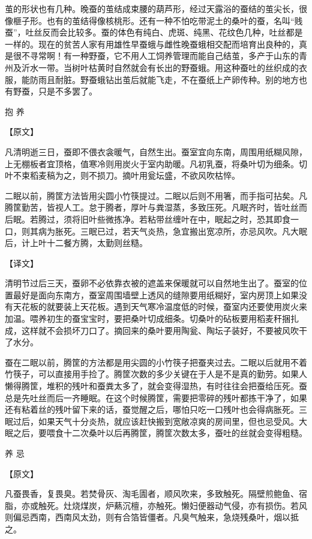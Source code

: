 \documentclass[12pt,UTF8]{ctexbook}
\begin{document}
茧的形状也有几种。晚蚕的茧结成束腰的葫芦形，经过天露浴的蚕结的茧尖长，很像榧子形。也有的茧结得像核桃形。还有一种不怕吃带泥土的桑叶的蚕，名叫“贱蚕”，吐丝反而会比较多。蚕的体色有纯白、虎斑、纯黑、花纹色几种，吐丝都是一样的。现在的贫苦人家有用雄性早蚕蛾与雌性晚蚕蛾相交配而培育出良种的，真是很不寻常啊！有一种野蚕，它不用人工饲养管理而能自己结茧，多产于山东的青州及沂水一带。当树叶枯黄时自然就会有长出的野蚕蛾。用这种蚕吐的丝织成的衣服，能防雨且耐脏。野蚕蛾钻出茧后就能飞走，不在蚕纸上产卵传种。别的地方也有野蚕，只是不多罢了。

抱 养

【原文】

凡清明逝三日，蚕即不偎衣衾暖气，自然生出。蚕室宜向东南，周围用纸糊风隙，上无棚板者宜顶格，值寒冷则用炭火于室内助暖。凡初乳蚕，将桑叶切为细条。切叶不束稻麦稿为之，则不损刀。摘叶用瓮坛盛，不欲风吹枯悴。

二眠以前，腾筐方法皆用尖圆小竹筷提过。二眠以后则不用箸，而手指可拈矣。凡腾筐勤苦，皆视人工。怠于腾者，厚叶与粪湿蒸，多致压死。凡眠齐时，皆吐丝而后眠。若腾过，须将旧叶些微拣净。若粘带丝缠叶在中，眠起之时，恐其即食一口，则其病为胀死。三眠已过，若天气炎热，急宜搬出宽凉所，亦忌风吹。凡大眠后，计上叶十二餐方腾，太勤则丝糙。

【译文】

清明节过后三天，蚕卵不必依靠衣被的遮盖来保暖就可以自然地生出了。蚕室的位置最好是面向东南方，蚕室周围墙壁上透风的缝隙要用纸糊好，室内房顶上如果没有天花板的就要装上天花板。遇到天气寒冷温度低的时候，蚕室内还要使用炭火来加温。喂养初生的蚕宝宝时，要把桑叶切成细条。切桑叶的砧板要用稻麦秆捆扎成，这样就不会损坏刀口了。摘回来的桑叶要用陶瓮、陶坛子装好，不要被风吹干了水分。

蚕在二眠以前，腾筐的方法都是用尖圆的小竹筷子把蚕夹过去。二眠以后就用不着竹筷子，可以直接用手捡了。腾筐次数的多少关键在于人是不是真的勤劳。如果人懒得腾筐，堆积的残叶和蚕粪太多了，就会变得湿热，有时往往会把蚕给压死。蚕总是先吐丝而后一齐睡眠。在这个时候腾筐，需要把零碎的残叶都拣干净了，如果还有粘着丝的残叶留下来的话，蚕觉醒之后，哪怕只吃一口残叶也会得病胀死。三眠过后，如果天气十分炎热，就应该赶快搬到宽敞凉爽的房间里，但也忌受风。大眠之后，要喂食十二次桑叶以后再腾筐，腾筐次数太多，蚕吐的丝就会变得粗糙。

养 忌

【原文】

凡蚕畏香，复畏臭。若焚骨灰、淘毛圊者，顺风吹来，多致触死。隔壁煎鲍鱼、宿脂，亦或触死。灶烧煤炭，炉爇沉檀，亦触死。懒妇便器动气侵，亦有损伤。若风则偏忌西南，西南风太劲，则有合箔皆僵者。凡臭气触来，急烧残桑叶，烟以抵之。
\end{document}
